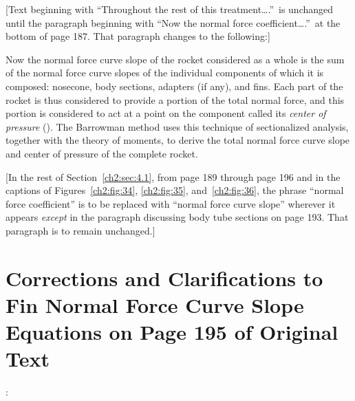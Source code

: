 \begin{center}
[Text beginning with ``Throughout the rest of this treatment\ldots.''\ is
unchanged until the paragraph beginning with ``Now the normal force
coefficient\ldots.''\ at the bottom of page 187. That paragraph changes to the
following:]
\end{center}

Now the normal force curve slope of the rocket considered as a whole is the sum
of the normal force curve slopes of the individual components of which it is
composed: nosecone, body sections, adapters (if any), and fins. Each part of
the rocket is thus considered to provide a portion of the total normal force,
and this portion is considered to act at a point on the component called its
\emph{center of pressure} (\CP). The Barrowman method uses this technique of
sectionalized analysis, together with the theory of moments, to derive the
total normal force curve slope and center of pressure of the complete rocket.

\begin{center}
[In the rest of Section~\ref{ch2:sec:4.1}, from page 189 through page 196
and in the captions of Figures~\ref{ch2:fig:34}, \ref{ch2:fig:35},
and~\ref{ch2:fig:36}, the phrase ``normal force coefficient'' is to be replaced
with ``normal force curve slope'' wherever it appears \emph{except} in the
paragraph discussing body tube sections on page 193. That paragraph is to
remain unchanged.]
\end{center}

\chapter{Corrections and Clarifications to Fin Normal Force Curve Slope Equations on Page 195 of Original Text}\label{supp:ch2-fins}

\noindent{}
\par\medskip

:

